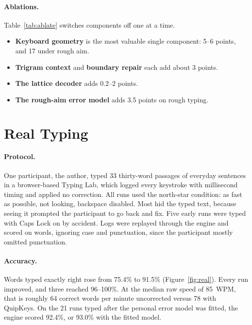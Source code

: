 \documentclass[11pt,a4paper]{article}
\newcommand{\qk}{QuipKeys}
\begin{document}
\begin{table}[t]
\centering\small
\caption{Held-out simulated typing (1,500 Brown test sentences per level).}
\label{tab:main}

\end{table}

\paragraph{Ablations.} Table~\ref{tab:ablate} switches components off one at a time.
\begin{itemize}
\item \textbf{Keyboard geometry} is the most valuable single component: 5--6 points, and 17 under rough aim.
\item \textbf{Trigram context} and \textbf{boundary repair} each add about 3 points.
\item \textbf{The lattice decoder} adds 0.2--2 points.
\item \textbf{The rough-aim error model} adds 3.5 points on rough typing.
\end{itemize}

\begin{table}[t]
\centering\small
\caption{Ablations: share of mistyped words fixed (held-out simulated typing).}
\label{tab:ablate}

\end{table}

\section{Real Typing}
\label{sec:real}

\paragraph{Protocol.} One participant, the author, typed 33 thirty-word passages of everyday sentences in a browser-based Typing Lab, which logged every keystroke with millisecond timing and applied no correction. All runs used the north-star condition: as fast as possible, not looking, backspace disabled. Most hid the typed text, because seeing it prompted the participant to go back and fix. Five early runs were typed with Caps Lock on by accident. Logs were replayed through the engine and scored on words, ignoring case and punctuation, since the participant mostly omitted punctuation.

\paragraph{Accuracy.} Words typed exactly right rose from 75.4\% to 91.5\% (Figure~\ref{fig:real}). Every run improved, and three reached 96--100\%. At the median raw speed of 85~WPM, that is roughly 64 correct words per minute uncorrected versus 78 with \qk. On the 21 runs typed after the personal error model was fitted, the engine scored 92.4\%, or 93.0\% with the fitted model.
\end{document}

